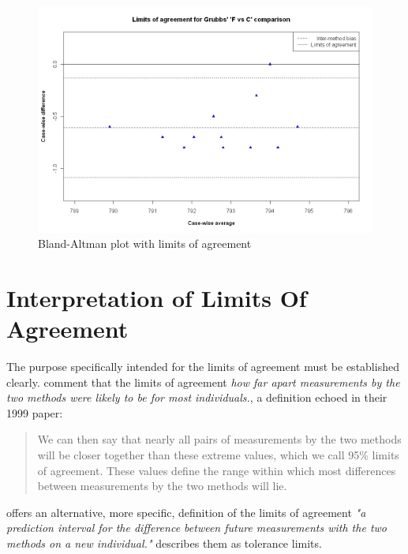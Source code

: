 \documentclass[12pt, a4paper]{report}
\theoremstyle{plain}
\theoremstyle{definition}
\theoremstyle{remark}
\begin{document}
\begin{figure}[h!]
	\begin{center}
		\includegraphics[width=125mm]{images/GrubbsBAplot-LOA.jpeg} 
		\caption{Bland-Altman plot with limits of agreement}
		\label{GrubbsBAplot-noLOA}
	\end{center}
\end{figure}
\newpage



\section{Interpretation of Limits Of Agreement}
The purpose specifically intended for the limits of agreement must be established clearly. \citet*{BA95} comment that the limits of agreement \emph{how far
	apart measurements by the two methods were likely to be for most
	individuals.}, a definition echoed in their 1999 paper:
\begin{quote} We can then say that nearly all pairs
	of measurements by the two methods will be closer together than
	these extreme values, which we call 95\% limits of agreement.
	These values define the range within which most differences
	between measurements by the two methods will lie\citep{BA99}.
\end{quote}
\citet{BXC2008} offers an alternative, more specific,  definition of
the limits of agreement \emph{"a prediction interval for the
	difference between future measurements with the two methods on a
	new individual."} \citet{luiz} describes them as tolerance limits.
\end{document}
